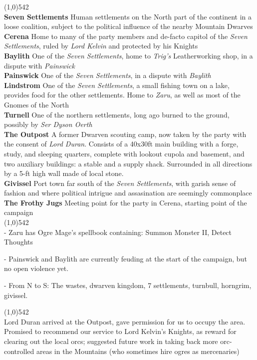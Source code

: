 \documentclass[letterpaper]{article}
\newcommand{\fullline}{\noindent\line(1,0){542} \\}
\begin{document}
\vspace{-1.75em}
\fullline
\textbf{Seven Settlements} Human settlements on the North part of the continent in a loose coalition, subject to the political influence of the nearby Mountain Dwarves \\
\textbf{Cerena} Home to many of the party members and de-facto capitol of the \emph{Seven Settlements}, ruled by \emph{Lord Kelvin} and protected by his Knights \\
\textbf{Baylith} One of the \emph{Seven Settlements}, home to \emph{Trig's} Leatherworking shop, in a dispute with \emph{Painswick} \\
\textbf{Painswick} One of the \emph{Seven Settlements}, in a dispute with \emph{Baylith} \\
\textbf{Lindstrom} One of the \emph{Seven Settlements}, a small fishing town on a lake, provides food for the other settlements.  Home to \emph{Zaru}, as well as most of the Gnomes of the North \\
\textbf{Turnell} One of the northern settlements, long ago burned to the ground, possibly by \emph{Ser Dyson Oerth} \\
\textbf{The Outpost} A former Dwarven scouting camp, now taken by the party with the consent of \emph{Lord Duran}.  Consists of a 40x30ft main building with a forge, study, and sleeping quarters, complete with lookout cupola and basement, and two auxiliary buildings: a stable and a supply shack. Surrounded in all directions by a 5-ft high wall made of local stone. \\
\textbf{Givissel} Port town far south of the \emph{Seven Settlements}, with garish sense of fashion and where political intrigue and assasination are seemingly commonplace \\
\textbf{The Frothy Jugs} Meeting point for the party in Cerena, starting point of the campaign\\

\vspace{-1.75em}
\fullline
\noindent - Zaru has Ogre Mage's spellbook containing: Summon Monster II, Detect Thoughts

\noindent - Painswick and Baylith are currently feuding at the start of the campaign, but no open violence yet.

\noindent - From N to S: The wastes, dwarven kingdom, 7 settlements, turnbull, horngrim, givissel.

\vspace{-0.75em}
\fullline
\noindent Lord Duran arrived at the Outpost, gave permission for us to occupy the area. Promised to recommend our service to Lord Kelvin's Knights, as reward for clearing out the local orcs; suggested future work in taking back more orc-controlled areas in the Mountains (who sometimes hire ogres as mercenaries)\\
\end{document}
